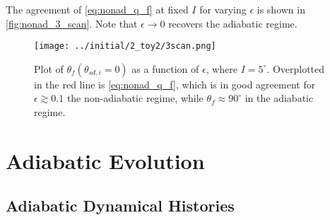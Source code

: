 \documentclass[
        fleqn,
        usenatbib,
    ]{mnras}
\newcommand*{\p}[1]{\left(#1\right)}
\begin{document}
The agreement of \autoref{eq:nonad_q_f} at fixed $I$ for varying $\epsilon$ is
shown in \autoref{fig:nonad_3_scan}. Note that $\epsilon \to 0$ recovers the
adiabatic regime.
\begin{figure}
    \centering
    \texttt{[image: ../initial/2\_toy2/3scan.png]}
    \caption{Plot of $\theta_{ f}\p{\theta_{sd, i} = 0}$ as a function of
    $\epsilon$, where $I = 5^\circ$. Overplotted in the red line is
    \autoref{eq:nonad_q_f}, which is in good agreement for $\epsilon \gtrsim
    0.1$ the non-adiabatic regime, while $\theta_{ f} \approx 90^\circ$ in
    the adiabatic regime.}\label{fig:nonad_3_scan}
\end{figure}




\appendix

\section{Adiabatic Evolution}

\subsection{Adiabatic Dynamical Histories}\label{ss:app_tracks}
\end{document}

